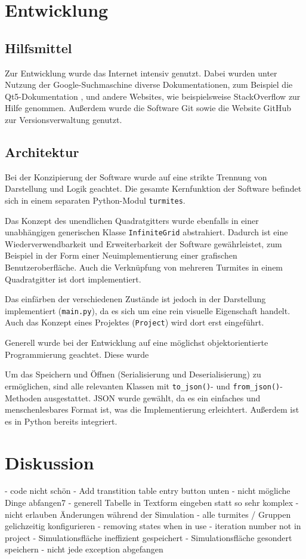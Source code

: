 \section{Entwicklung}
\subsection{Hilfsmittel}
Zur Entwicklung wurde das Internet intensiv genutzt. Dabei wurden unter Nutzung der Google-Suchmaschine \cite{google} diverse Dokumentationen, zum Beispiel die Qt5-Dokumentation \cite{qt5}, und andere Websites, wie beispielsweise StackOverflow \cite{stackoverflow} zur Hilfe genommen. Außerdem wurde die Software Git \cite{git} sowie die Website GitHub \cite{github} zur Versionsverwaltung genutzt. 

\subsection{Architektur}
Bei der Konzipierung der Software wurde auf eine strikte Trennung von Darstellung und Logik geachtet. Die gesamte Kernfunktion der Software befindet sich in einem separaten Python-Modul \texttt{turmites}.

Das Konzept des unendlichen Quadratgitters wurde ebenfalls in einer unabhängigen generischen Klasse \texttt{InfiniteGrid} abstrahiert. Dadurch ist eine Wiederverwendbarkeit und Erweiterbarkeit der Software gewährleistet, zum Beispiel in der Form einer Neuimplementierung einer grafischen Benutzeroberfläche. Auch die Verknüpfung von mehreren Turmites in einem Quadratgitter ist dort implementiert. 

Das einfärben der verschiedenen Zustände ist jedoch in der Darstellung implementiert (\texttt{main.py}), da es sich um eine rein visuelle Eigenschaft handelt. Auch das Konzept eines Projektes (\texttt{Project}) wird dort erst eingeführt.

Generell wurde bei der Entwicklung auf eine möglichst objektorientierte Programmierung geachtet. Diese wurde 

Um das Speichern und Öffnen (Serialisierung und Deserialisierung) zu ermöglichen, sind alle relevanten Klassen mit \texttt{to\_json()}- und \texttt{from\_json()}-Methoden ausgestattet. JSON wurde gewählt, da es ein einfaches und menschenlesbares Format ist, was die Implementierung erleichtert. Außerdem ist es in Python bereits integriert.

\section{Diskussion}
- code nicht schön
- Add transtition table entry button unten
- nicht mögliche Dinge abfangen7
- generell Tabelle in Textform eingeben statt so sehr komplex
- nicht erlauben Änderungen während der Simulation
- alle turmites / Gruppen gelichzeitig konfigurieren
- removing states when in use
- iteration number not in project
- Simulationsfläche ineffizient gespeichert
- Simulationsfläche gesondert speichern
- nicht jede exception abgefangen